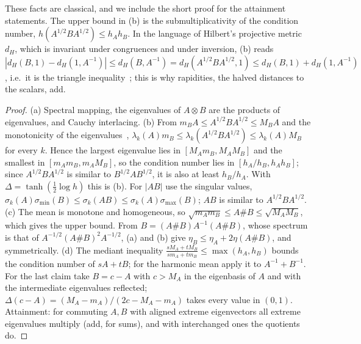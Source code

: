 \documentclass[11pt]{article}
\theoremstyle{plain}
\theoremstyle{definition}
\theoremstyle{remark}
\begin{document}
\noindent These facts are classical, and we include the short proof for the attainment statements. The upper bound in (b)
is the submultiplicativity of the condition number, $h(A^{1/2}BA^{1/2})\le h_Ah_B$. In the language of Hilbert's projective
metric $d_H$, which is invariant under congruences and under inversion, (b) reads
$|d_H(B,1)-d_H(1,A^{-1})|\le d_H(B,A^{-1})=d_H(A^{1/2}BA^{1/2},1)\le d_H(B,1)+d_H(1,A^{-1})$, i.e.\ it is the triangle
inequality~\cite{bushell1973,lemmens2012}; this is why rapidities, the halved distances to the scalars, add.
\begin{proof}
(a) Spectral mapping, the eigenvalues of $A\otimes B$ are the products of eigenvalues, and Cauchy interlacing.
(b) From $m_BA\le A^{1/2}BA^{1/2}\le M_BA$ and the monotonicity of the eigenvalues~\cite{bhatia1997},
$\lambda_k(A)m_B\le\lambda_k(A^{1/2}BA^{1/2})\le\lambda_k(A)M_B$ for every $k$. Hence the largest eigenvalue lies in
$[M_Am_B,M_AM_B]$ and the smallest in $[m_Am_B,m_AM_B]$, so the condition number lies in $[h_A/h_B,h_Ah_B]$; since
$A^{1/2}BA^{1/2}$ is similar to $B^{1/2}AB^{1/2}$, it is also at least $h_B/h_A$. With $\Delta=\tanh(\frac12\log h)$ this
is (b). For $|AB|$ use the singular values, $\sigma_k(A)\sigma_{\min}(B)\le\sigma_k(AB)\le\sigma_k(A)\sigma_{\max}(B)$;
$AB$ is similar to $A^{1/2}BA^{1/2}$. (c) The mean is monotone and homogeneous, so $\sqrt{m_Am_B}\le A\#B\le
\sqrt{M_AM_B}$, which gives the upper bound. From $B=(A\#B)A^{-1}(A\#B)$, whose spectrum is that of
$A^{-1/2}(A\#B)^2A^{-1/2}$, (a) and (b) give $\eta_B\le\eta_A+2\eta(A\#B)$, and symmetrically. (d) The mediant inequality
$\frac{sM_A+tM_B}{sm_A+tm_B}\le\max(h_A,h_B)$ bounds the condition number of $sA+tB$; for the harmonic mean apply it to
$A^{-1}+B^{-1}$. For the last claim take $B=c-A$ with $c>M_A$ in the eigenbasis of $A$ and with the intermediate
eigenvalues reflected; $\Delta(c-A)=(M_A-m_A)/(2c-M_A-m_A)$ takes every value in $(0,1)$. Attainment: for commuting
$A,B$ with aligned extreme eigenvectors all extreme eigenvalues multiply (add, for sums), and with interchanged ones the
quotients do.
\end{proof}
\end{document}
